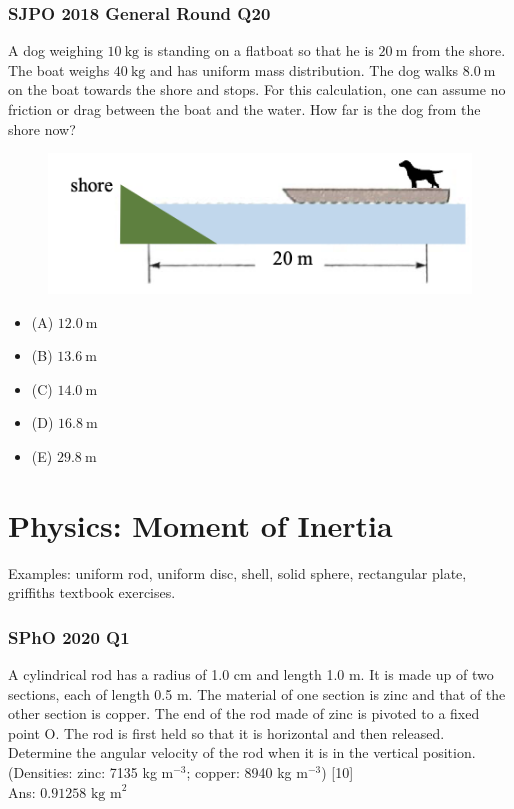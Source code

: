 \documentclass{article}
\begin{document}
\subsubsection{SJPO 2018 General Round Q20}
A dog weighing $10 \mathrm{~kg}$ is standing on a flatboat so that he is $20 \mathrm{~m}$ from the shore. The boat weighs $40 \mathrm{~kg}$ and has uniform mass distribution. The dog walks $8.0 \mathrm{~m}$ on the boat towards the shore and stops. For this calculation, one can assume no friction or drag between the boat and the water. How far is the dog from the shore now? \\
{
\begin{figure}
\includegraphics[width=1.0\linewidth]{images/sjpo2018q20.png}
\end{figure}
\begin{itemize}
\item[] (A) $12.0 \mathrm{~m}$
\item[] (B) $13.6 \mathrm{~m}$
\item[] (C) $14.0 \mathrm{~m}$
\item[] (D) $16.8 \mathrm{~m}$
\item[] (E) $29.8 \mathrm{~m}$
\end{itemize}
}
\clearpage


\section{Physics: Moment of Inertia}
Examples: uniform rod, uniform disc, shell, solid sphere, rectangular plate, griffiths textbook exercises.

\subsubsection{SPhO 2020 Q1}
A cylindrical rod has a radius of 1.0 cm and length 1.0 m. It is made up of two sections, each of length 0.5 m. The material of one section is zinc and that of the other section is copper. The end of the rod made of zinc is pivoted to a fixed point O. The rod is first held so that it is horizontal and then released. Determine the angular velocity of the rod when it is in the vertical position. (Densities: zinc: 7135 kg $\text{m}^{-3}$; copper: 8940 kg $\text{m}^{-3}$) [10]\\
\noindent Ans: $0.91258 \text{ kg m}^2$
\clearpage
\end{document}

